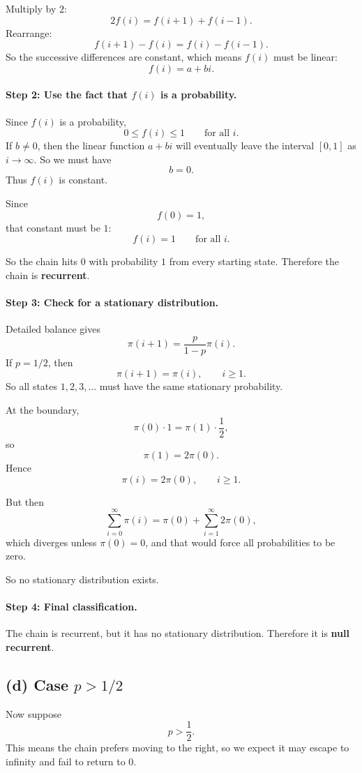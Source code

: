 \documentclass[11pt]{article}
\begin{document}
Multiply by $2$:
\[
2f(i)=f(i+1)+f(i-1).
\]
Rearrange:
\[
f(i+1)-f(i)=f(i)-f(i-1).
\]
So the successive differences are constant, which means $f(i)$ must be linear:
\[
f(i)=a+bi.
\]

\paragraph{Step 2: Use the fact that $f(i)$ is a probability.}

Since $f(i)$ is a probability,
\[
0\le f(i)\le1 \qquad \text{for all } i.
\]
If $b\neq0$, then the linear function $a+bi$ will eventually leave the interval $[0,1]$ as $i\to\infty$.
So we must have
\[
b=0.
\]
Thus $f(i)$ is constant.

Since
\[
f(0)=1,
\]
that constant must be $1$:
\[
f(i)=1 \qquad \text{for all } i.
\]

So the chain hits $0$ with probability $1$ from every starting state. Therefore the chain is \textbf{recurrent}.

\paragraph{Step 3: Check for a stationary distribution.}

Detailed balance gives
\[
\pi(i+1)=\frac{p}{1-p}\pi(i).
\]
If $p=1/2$, then
\[
\pi(i+1)=\pi(i), \qquad i\ge1.
\]
So all states $1,2,3,\dots$ must have the same stationary probability.

At the boundary,
\[
\pi(0)\cdot 1=\pi(1)\cdot \frac12,
\]
so
\[
\pi(1)=2\pi(0).
\]
Hence
\[
\pi(i)=2\pi(0), \qquad i\ge1.
\]

But then
\[
\sum_{i=0}^\infty \pi(i)
=
\pi(0)+\sum_{i=1}^\infty 2\pi(0),
\]
which diverges unless $\pi(0)=0$, and that would force all probabilities to be zero.

So no stationary distribution exists.

\paragraph{Step 4: Final classification.}

The chain is recurrent, but it has no stationary distribution.
Therefore it is \textbf{null recurrent}.

\subsection*{(d) Case $p>1/2$}

Now suppose
\[
p>\frac12.
\]
This means the chain prefers moving to the right, so we expect it may escape to infinity and fail to return to $0$.
\end{document}
